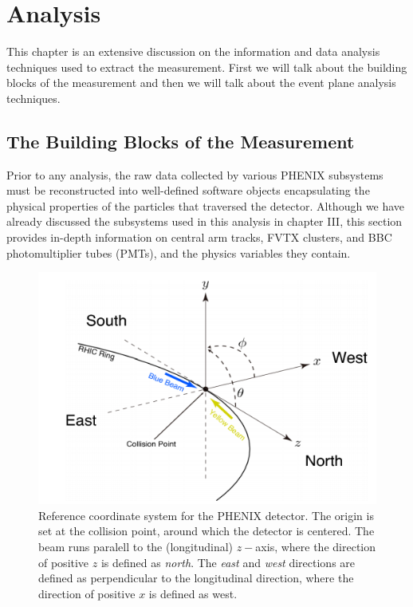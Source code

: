 \chapter{Analysis}
This chapter is an extensive discussion on the information and data analysis techniques used to extract the measurement. First we will talk about the building blocks of the measurement and then we will talk about the event plane analysis techniques.
\section{The Building Blocks of the Measurement}
Prior to any analysis, the raw data collected by various PHENIX subsystems must be reconstructed into well-defined software objects encapsulating the physical properties of the particles that traversed the detector. Although we have already discussed the subsystems used in this analysis in chapter III, this section provides in-depth information on central arm tracks, FVTX clusters, and BBC photomultiplier tubes (PMTs), and the physics variables they contain. 


\begin{figure}[!h]
\begin{center}
\includegraphics[width=0.55\linewidth]{figs/phenix_coord.png}
\caption{Reference coordinate system for the PHENIX detector. The origin is set at the collision point, around which the detector is centered. The beam runs paralell to the (longitudinal) $z-$axis, where the direction of positive $z$ is defined as \emph{north}. The \emph{east} and \emph{west} directions are defined as perpendicular to the longitudinal direction, where the direction of positive $x$ is defined as west.}
\end{center}
\end{figure}

